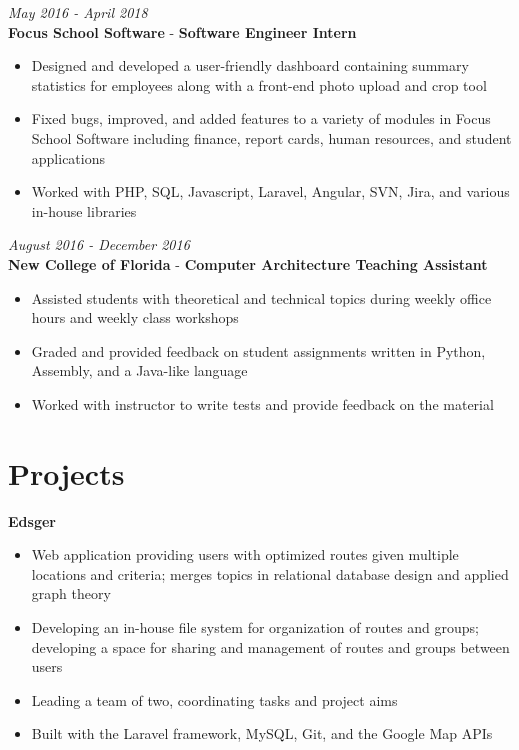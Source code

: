 \documentclass[margin,line,a4paper]{resume}
\begin{document}
\begin{resume}
        \textit{May 2016 - April 2018}\\
        \textbf{Focus School Software} - \textbf{Software Engineer Intern}
        \begin{itemize}
            \item Designed and developed a user-friendly dashboard containing summary statistics for employees along with a front-end photo upload and crop tool
            \item Fixed bugs, improved, and added features to a variety of modules in Focus School Software including finance, report cards, human resources, and student applications
            \item Worked with PHP, SQL, Javascript, Laravel, Angular, SVN, Jira, and various in-house libraries
        \end{itemize}
            
        \textit{August 2016 - December 2016}\\
        \textbf{New College of Florida} - \textbf{Computer Architecture Teaching Assistant}
        \begin{itemize}
            \item Assisted students with theoretical and technical topics during weekly office hours and weekly class workshops
            \item Graded and provided feedback on student assignments written in Python, Assembly, and a Java-like language 
            \item Worked with instructor to write tests and provide feedback on the material
        \end{itemize}
        
    \section{\mysidestyle Projects}
        \textbf{Edsger}
        \begin{itemize}
            \item Web application providing users with optimized routes given multiple locations and criteria; merges topics in relational database design and applied graph theory
            \item Developing an in-house file system for organization of routes and groups; developing a space for sharing and management of routes and groups between users
            \item Leading a team of two, coordinating tasks and project aims
            \item Built with the Laravel framework, MySQL, Git, and the Google Map APIs
        \end{itemize}
    

\end{resume}
\end{document}

